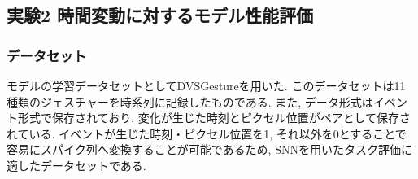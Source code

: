\makeatletter %
\subsection{実験2 時間変動に対するモデル性能評価}

\subsubsection{データセット}
モデルの学習データセットとしてDVSGesture\cite{dvsgesture}を用いた.
このデータセットは11種類のジェスチャーを時系列に記録したものである.
また, データ形式はイベント形式で保存されており, 変化が生じた時刻とピクセル位置がペアとして保存されている.
イベントが生じた時刻・ピクセル位置を1, それ以外を0とすることで容易にスパイク列へ変換することが可能であるため, SNNを用いたタスク評価に適したデータセットである\cite{9207109}.


